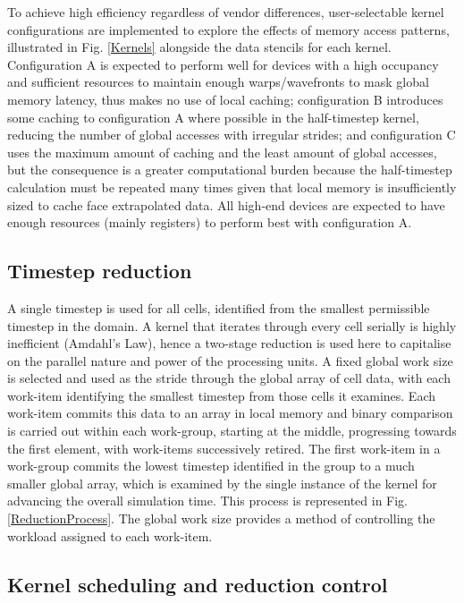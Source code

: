 \documentclass[11pt,english,a4paper]{article}
\begin{document}
To achieve high efficiency regardless of vendor differences, user-selectable kernel configurations are implemented to explore the effects of memory access patterns, illustrated in Fig. \ref{Kernels} alongside the data stencils for each kernel. Configuration A is expected to perform well for devices with a high occupancy and sufficient resources to maintain enough warps/wavefronts to mask global memory latency, thus makes no use of local caching; configuration B introduces some caching to configuration A where possible in the half-timestep kernel, reducing the number of global accesses with irregular strides; and configuration C uses the maximum amount of caching and the least amount of global accesses, but the consequence is a greater computational burden because the half-timestep calculation must be repeated many times given that local memory is insufficiently sized to cache face extrapolated data. All high-end devices are expected to have enough resources (mainly registers) to perform best with configuration A. 

\subsection{Timestep reduction}

A single timestep is used for all cells, identified from the smallest permissible timestep in the domain. A kernel that iterates through every cell serially is highly inefficient (Amdahl's Law), hence a two-stage reduction is used here to capitalise on the parallel nature and power of the processing units. A fixed global work size is selected and used as the stride through the global array of cell data, with each work-item identifying the smallest timestep from those cells it examines. Each work-item commits this data to an array in local memory and binary comparison is carried out within each work-group, starting at the middle, progressing towards the first element, with work-items successively retired. The first work-item in a work-group commits the lowest timestep identified in the group to a much smaller global array, which is examined by the single instance of the kernel for advancing the overall simulation time. This process is represented in Fig. \ref{ReductionProcess}. The global work size provides a method of controlling the workload assigned to each work-item.

\subsection{Kernel scheduling and reduction control}
\end{document}
